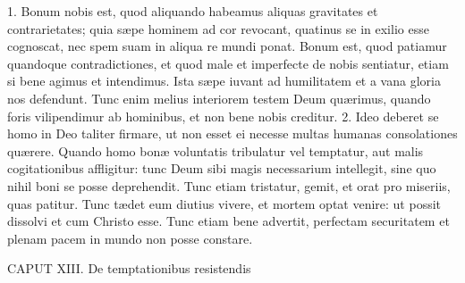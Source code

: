 1. Bonum nobis est, quod aliquando habeamus aliquas gravitates et contrarietates; quia sæpe hominem ad cor revocant, quatinus se in exilio esse cognoscat, nec spem suam in aliqua re mundi ponat. Bonum est, quod patiamur quandoque contradictiones, et quod male et imperfecte de nobis sentiatur, etiam si bene agimus et intendimus. Ista sæpe iuvant ad humilitatem et a vana gloria nos defendunt. Tunc enim melius interiorem testem Deum quærimus, quando foris vilipendimur ab hominibus, et non bene nobis creditur.
2. Ideo deberet se homo in Deo taliter firmare, ut non esset ei necesse multas humanas consolationes quærere. Quando homo bonæ voluntatis tribulatur vel temptatur, aut malis cogitationibus affligitur: tunc Deum sibi magis necessarium intellegit, sine quo nihil boni se posse deprehendit. Tunc etiam tristatur, gemit, et orat pro miseriis, quas patitur. Tunc tædet eum diutius vivere, et mortem optat venire: ut possit dissolvi et cum Christo esse. Tunc etiam bene advertit, perfectam securitatem et plenam pacem in mundo non posse constare.


CAPUT XIII.
De temptationibus resistendis

